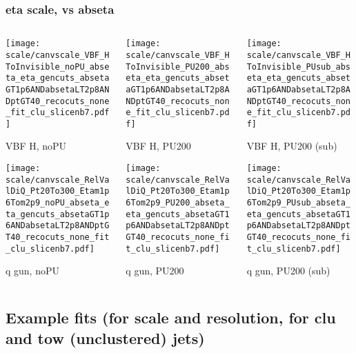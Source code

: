 \documentclass[8pt]{beamer}
\begin{document}
  \begin{frame}
  \frametitle{eta scale, vs abseta}
  
  \begin{columns}
   \begin{column}{0.35\textwidth}
     \texttt{[image: scale/canvscale\_VBF\_HToInvisible\_noPU\_abseta\_eta\_gencuts\_absetaGT1p6ANDabsetaLT2p8ANDptGT40\_recocuts\_none\_fit\_clu\_slicenb7.pdf]}
     
     VBF H, noPU
    
     \texttt{[image: scale/canvscale\_RelValDiQ\_Pt20To300\_Etam1p6Tom2p9\_noPU\_abseta\_eta\_gencuts\_absetaGT1p6ANDabsetaLT2p8ANDptGT40\_recocuts\_none\_fit\_clu\_slicenb7.pdf]}
     
     q gun, noPU
   \end{column}
   \begin{column}{0.35\textwidth}
     \texttt{[image: scale/canvscale\_VBF\_HToInvisible\_PU200\_abseta\_eta\_gencuts\_absetaGT1p6ANDabsetaLT2p8ANDptGT40\_recocuts\_none\_fit\_clu\_slicenb7.pdf]}
     
     VBF H, PU200
    
     \texttt{[image: scale/canvscale\_RelValDiQ\_Pt20To300\_Etam1p6Tom2p9\_PU200\_abseta\_eta\_gencuts\_absetaGT1p6ANDabsetaLT2p8ANDptGT40\_recocuts\_none\_fit\_clu\_slicenb7.pdf]}
     
     q gun, PU200
   \end{column}
   \begin{column}{0.35\textwidth}
     \texttt{[image: scale/canvscale\_VBF\_HToInvisible\_PUsub\_abseta\_eta\_gencuts\_absetaGT1p6ANDabsetaLT2p8ANDptGT40\_recocuts\_none\_fit\_clu\_slicenb7.pdf]}
     
     VBF H, PU200 (sub)
    
     \texttt{[image: scale/canvscale\_RelValDiQ\_Pt20To300\_Etam1p6Tom2p9\_PUsub\_abseta\_eta\_gencuts\_absetaGT1p6ANDabsetaLT2p8ANDptGT40\_recocuts\_none\_fit\_clu\_slicenb7.pdf]}
     
     q gun, PU200 (sub)
   \end{column}
  \end{columns}
 \end{frame}
 
  \subsection{Example fits (for scale and resolution, for clu and tow (unclustered) jets)}
\end{document}
